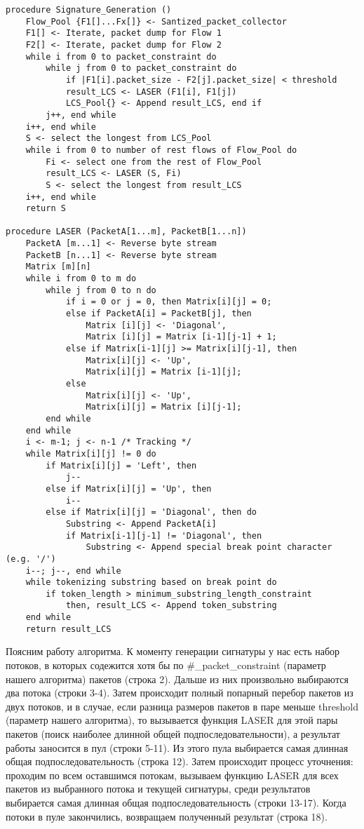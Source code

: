 \begin{lstlisting}[language=PL/I]
procedure Signature_Generation ()
    Flow_Pool {F1[]...Fx[]} <- Santized_packet_collector
    F1[] <- Iterate, packet dump for Flow 1
    F2[] <- Iterate, packet dump for Flow 2
    while i from 0 to packet_constraint do
        while j from 0 to packet_constraint do
            if |F1[i].packet_size - F2[j].packet_size| < threshold
            result_LCS <- LASER (F1[i], F1[j])
            LCS_Pool{} <- Append result_LCS, end if
        j++, end while
    i++, end while
    S <- select the longest from LCS_Pool
    while i from 0 to number of rest flows of Flow_Pool do
        Fi <- select one from the rest of Flow_Pool
        result_LCS <- LASER (S, Fi)
        S <- select the longest from result_LCS
    i++, end while
    return S

procedure LASER (PacketA[1...m], PacketB[1...n])
    PacketA [m...1] <- Reverse byte stream
    PacketB [n...1] <- Reverse byte stream
    Matrix [m][n]
    while i from 0 to m do
        while j from 0 to n do
            if i = 0 or j = 0, then Matrix[i][j] = 0;
            else if PacketA[i] = PacketB[j], then
                Matrix [i][j] <- 'Diagonal',
                Matrix [i][j] = Matrix [i-1][j-1] + 1;
            else if Matrix[i-1][j] >= Matrix[i][j-1], then
                Matrix[i][j] <- 'Up',
                Matrix[i][j] = Matrix [i-1][j];
            else
                Matrix[i][j] <- 'Up',
                Matrix[i][j] = Matrix [i][j-1];
        end while
    end while
    i <- m-1; j <- n-1 /* Tracking */
    while Matrix[i][j] != 0 do
        if Matrix[i][j] = 'Left', then
            j--
        else if Matrix[i][j] = 'Up', then
            i--
        else if Matrix[i][j] = 'Diagonal', then do
            Substring <- Append PacketA[i]
            if Matrix[i-1][j-1] != 'Diagonal', then
                Substring <- Append special break point character (e.g. '/')
    i--; j--, end while
    while tokenizing substring based on break point do
        if token_length > minimum_substring_length_constraint
            then, result_LCS <- Append token_substring
    end while
    return result_LCS
\end{lstlisting}

Поясним работу алгоритма. К моменту генерации сигнатуры у нас есть набор потоков,
в которых содежится хотя бы по \#\_packet\_constraint (параметр нашего алгоритма) пакетов (строка 2).
Дальше из них произвольно выбираются два потока (строки 3-4). Затем происходит полный попарный перебор пакетов из двух потоков,
и в случае, если разница размеров пакетов в паре меньше threshold (параметр нашего алгоритма),
то вызывается функция LASER для этой пары пакетов (поиск наиболее длинной общей подпоследовательности),
а результат работы заносится в пул (строки 5-11).
Из этого пула выбирается самая длинная общая подпоследовательность (строка 12).
Затем происходит процесс уточнения: проходим по всем оставшимся потокам, вызываем функцию LASER для всех пакетов из выбранного потока и текущей сигнатуры,
среди результатов выбирается самая длинная общая подпоследовательность (строки 13-17). Когда потоки в пуле закончились, возвращаем полученный результат (строка 18).

